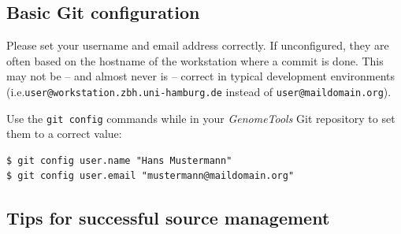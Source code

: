 \documentclass[11pt,final]{article}
\newcommand{\keyword}[1]{\lstinline{#1}}
\newcommand{\Gt}[0]{\emph{GenomeTools}\xspace}
\begin{document}
\subsection{Basic Git configuration}

Please set your username and email address correctly. If unconfigured, they are
often based on the hostname of the workstation where a commit is done. This may
not be -- and almost never is --  correct in typical development environments
(i.e.\@ \keyword{user@workstation.zbh.uni-hamburg.de} instead of
\keyword{user@maildomain.org}).

Use the \keyword{git config} commands while in your \Gt Git repository to set
them to a correct value:

\begin{lstlisting}
$ git config user.name "Hans Mustermann"
$ git config user.email "mustermann@maildomain.org"
\end{lstlisting}

\subsection{Tips for successful source management}
\end{document}
